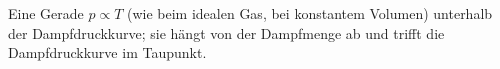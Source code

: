 Eine Gerade $p \propto T$ (wie beim idealen Gas, bei konstantem Volumen) unterhalb der Dampfdruckkurve; sie hängt von der Dampfmenge ab und trifft die Dampfdruckkurve im Taupunkt.
